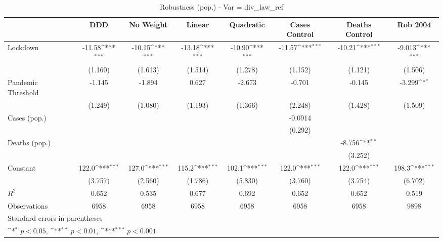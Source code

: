 \documentclass{article}
\begin{document}
{
\def\sym#1{\ifmmode^{#1}\else\(^{#1}\)\fi}
\begin{longtable}{l*{7}{c}}
\caption{Robustness (pop.) - Var = div\_law\_ref}\\
\hline\hline\endfirsthead\hline\endhead\hline\endfoot\endlastfoot
                &\multicolumn{1}{c}{DDD}&\multicolumn{1}{c}{No Weight}&\multicolumn{1}{c}{Linear}&\multicolumn{1}{c}{Quadratic}&\multicolumn{1}{c}{Cases Control}&\multicolumn{1}{c}{Deaths Control}&\multicolumn{1}{c}{Rob 2004}\\
\hline
Lockdown        &   -11.58\sym{***}&   -10.15\sym{***}&   -13.18\sym{***}&   -10.90\sym{***}&   -11.57\sym{***}&   -10.21\sym{***}&   -9.013\sym{***}\\
                &  (1.160)         &  (1.613)         &  (1.514)         &  (1.278)         &  (1.152)         &  (1.121)         &  (1.506)         \\
Pandemic Threshold&   -1.145         &   -1.894         &    0.627         &   -2.673         &   -0.701         &   -0.145         &   -3.299\sym{*}  \\
                &  (1.249)         &  (1.080)         &  (1.193)         &  (1.366)         &  (2.248)         &  (1.428)         &  (1.509)         \\
Cases (pop.)    &                  &                  &                  &                  &  -0.0914         &                  &                  \\
                &                  &                  &                  &                  &  (0.292)         &                  &                  \\
Deaths (pop.)   &                  &                  &                  &                  &                  &   -8.756\sym{**} &                  \\
                &                  &                  &                  &                  &                  &  (3.252)         &                  \\
Constant        &    122.0\sym{***}&    127.0\sym{***}&    115.2\sym{***}&    102.1\sym{***}&    122.0\sym{***}&    122.0\sym{***}&    198.3\sym{***}\\
                &  (3.757)         &  (2.560)         &  (1.786)         &  (5.830)         &  (3.760)         &  (3.754)         &  (6.702)         \\
\hline
\(R^{2}\)       &    0.652         &    0.535         &    0.677         &    0.692         &    0.652         &    0.652         &    0.519         \\
Observations    &     6958         &     6958         &     6958         &     6958         &     6958         &     6958         &     9898         \\
\hline\hline
\multicolumn{8}{l}{\footnotesize Standard errors in parentheses}\\
\multicolumn{8}{l}{\footnotesize \sym{*} \(p<0.05\), \sym{**} \(p<0.01\), \sym{***} \(p<0.001\)}\\
\end{longtable}
}
\end{document}

